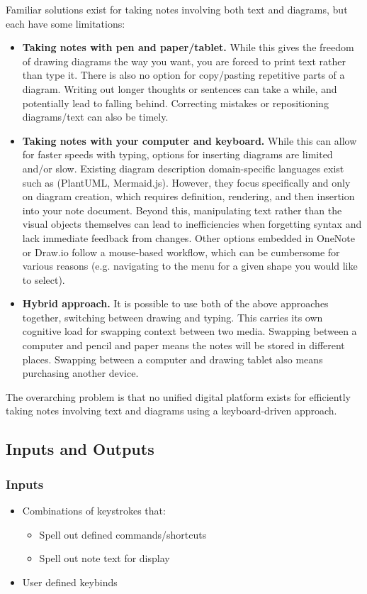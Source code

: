 \documentclass{article}
\begin{document}
\noindent Familiar solutions exist for taking notes involving both text and
diagrams, but each have some limitations:
\begin{itemize}
  \item \textbf{Taking notes with pen and paper/tablet.} While this gives the
    freedom of drawing diagrams the way you want, you are forced to print text
    rather than type it. There is also no option for copy/pasting repetitive
    parts of a diagram. Writing out longer thoughts or sentences can take a
    while, and potentially lead to falling behind. Correcting mistakes or
    repositioning diagrams/text can also be timely.
  \item \textbf{Taking notes with your computer and keyboard.} While this can
    allow for faster speeds with typing, options for inserting diagrams are
    limited and/or slow. Existing diagram description domain-specific languages
    exist such as (PlantUML, Mermaid.js). However, they focus
    specifically and only on diagram creation, which requires definition,
    rendering, and then insertion into your note document. Beyond this,
    manipulating text rather than the visual objects themselves can lead to
    inefficiencies when forgetting syntax and lack immediate feedback from
    changes. Other options embedded in OneNote or Draw.io follow a mouse-based
    workflow, which can be cumbersome for various reasons (e.g. navigating to
    the menu for a given shape you would like to select).
  \item \textbf{Hybrid approach.} It is possible to use both of the above
    approaches together, switching between drawing and typing. This carries its
    own cognitive load for swapping context between two media. Swapping between
    a computer and pencil and paper means the notes will be stored in different
    places. Swapping between a computer and drawing tablet also means
    purchasing another device.
\end{itemize}

\noindent The overarching problem is that no unified digital platform exists for
efficiently taking notes involving text and diagrams using a keyboard-driven
approach.

\subsection{Inputs and Outputs}

\subsubsection{Inputs}
\begin{itemize}
	\item Combinations of keystrokes that:
	      \begin{itemize}
		      \item Spell out defined commands/shortcuts
		      \item Spell out note text for display
	      \end{itemize}
	\item User defined keybinds
\end{itemize}
\end{document}
